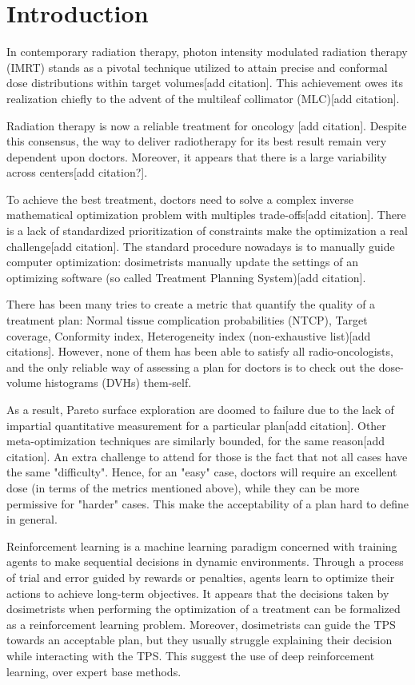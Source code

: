 \section{Introduction}
In contemporary radiation therapy, photon intensity modulated radiation therapy (IMRT) stands as a pivotal technique utilized to attain precise and conformal dose distributions within target volumes[add citation].
This achievement owes its realization chiefly to the advent of the multileaf collimator (MLC)[add citation].

Radiation therapy is now a reliable treatment for oncology [add citation].
Despite this consensus, the way to deliver radiotherapy for its best result remain very dependent upon doctors.
Moreover, it appears that there is a large variability across centers[add citation?].

To achieve the best treatment, doctors need to solve a complex inverse mathematical optimization problem with multiples trade-offs[add citation].
There is a lack of standardized prioritization of constraints make the optimization a real challenge[add citation].
The standard procedure nowadays is to manually guide computer optimization: dosimetrists manually update the settings of an optimizing software (so called Treatment Planning System)[add citation].

There has been many tries to create a metric that quantify the quality of a treatment plan: Normal tissue complication probabilities (NTCP), Target coverage, Conformity index, Heterogeneity index (non-exhaustive list)[add citations].
However, none of them has been able to satisfy all radio-oncologists, and the only reliable way of assessing a plan for doctors is to check out the dose-volume histograms (DVHs) them-self.

As a result, Pareto surface exploration are doomed to failure due to the lack of impartial quantitative measurement for a particular plan[add citation].
Other meta-optimization techniques are similarly bounded, for the same reason[add citation].
An extra challenge to attend for those is the fact that not all cases have the same "difficulty".
Hence, for an "easy" case, doctors will require an excellent dose (in terms of the metrics mentioned above), while they can be more permissive for "harder" cases.
This make the acceptability of a plan hard to define in general.

Reinforcement learning is a machine learning paradigm concerned with training agents to make sequential decisions in dynamic environments.
Through a process of trial and error guided by rewards or penalties, agents learn to optimize their actions to achieve long-term objectives.
It appears that the decisions taken by dosimetrists when performing the optimization of a treatment can be formalized as a reinforcement learning problem.
Moreover, dosimetrists can guide the TPS towards an acceptable plan, but they usually struggle explaining their decision while interacting with the TPS.
This suggest the use of deep reinforcement learning, over expert base methods.

